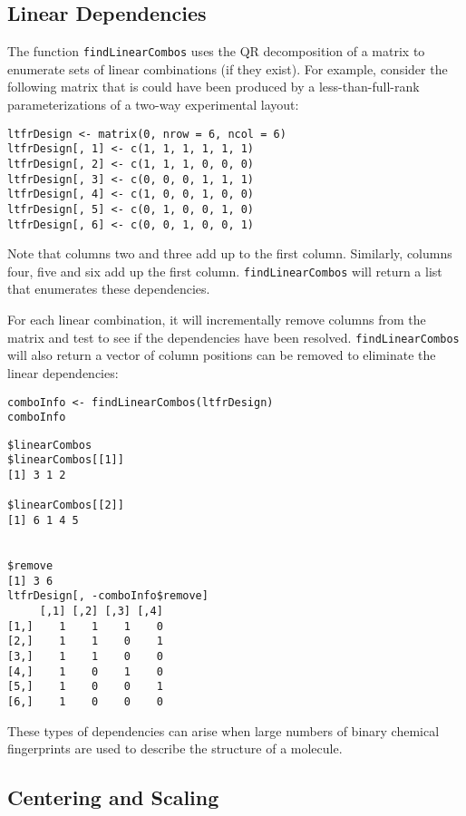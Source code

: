 \documentclass[caret-main.tex]{subfiles}
\begin{document}
\subsection{Linear Dependencies}

The function \texttt{findLinearCombos} uses the QR decomposition of a matrix to enumerate sets of linear combinations (if they exist). For example, consider the following matrix that is could have been produced by a less-than-full-rank parameterizations of a two-way experimental layout:
\begin{verbatim}
ltfrDesign <- matrix(0, nrow = 6, ncol = 6)
ltfrDesign[, 1] <- c(1, 1, 1, 1, 1, 1)
ltfrDesign[, 2] <- c(1, 1, 1, 0, 0, 0)
ltfrDesign[, 3] <- c(0, 0, 0, 1, 1, 1)
ltfrDesign[, 4] <- c(1, 0, 0, 1, 0, 0)
ltfrDesign[, 5] <- c(0, 1, 0, 0, 1, 0)
ltfrDesign[, 6] <- c(0, 0, 1, 0, 0, 1)
\end{verbatim}
Note that columns two and three add up to the first column. Similarly, columns four, five and six add up the first column. \texttt{findLinearCombos} will return a list that enumerates these dependencies. 

\noindent For each linear combination, it will incrementally remove columns from the matrix and test to see if the dependencies have been resolved. \texttt{findLinearCombos} will also return a vector of column positions can be removed to eliminate the linear dependencies:
\begin{framed}
\begin{verbatim}
comboInfo <- findLinearCombos(ltfrDesign)
comboInfo
\end{verbatim}
\end{framed}
\begin{verbatim}
$linearCombos
$linearCombos[[1]]
[1] 3 1 2

$linearCombos[[2]]
[1] 6 1 4 5


$remove
[1] 3 6
ltfrDesign[, -comboInfo$remove]
     [,1] [,2] [,3] [,4]
[1,]    1    1    1    0
[2,]    1    1    0    1
[3,]    1    1    0    0
[4,]    1    0    1    0
[5,]    1    0    0    1
[6,]    1    0    0    0
\end{verbatim}
These types of dependencies can arise when large numbers of binary chemical fingerprints are used to describe the structure of a molecule.

\newpage
\subsection{Centering and Scaling}
\end{document}
